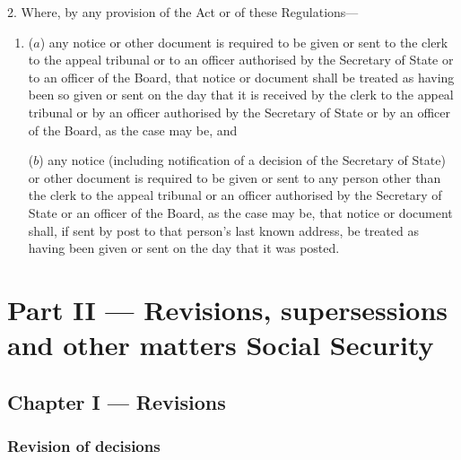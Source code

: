 \documentclass[12pt,a4paper]{article}
\begin{document}
2.  Where, by any provision of the Act or of these Regulations—
\begin{enumerate}\item[]
($a$) any notice or other document is required to be given or sent to the clerk to the appeal tribunal or to an officer authorised by the Secretary of State
or to an officer of the Board,  %
that notice or document shall be treated as having been so given or sent on the day that it is received by the clerk to the appeal tribunal or by an officer authorised by the Secretary of State
or by an officer of the Board,  %
as the case may be, and

($b$) any notice (including notification of a decision of the Secretary of State) or other document is required to be given or sent to any person other than the clerk to the appeal tribunal 
or an officer  %
authorised by the Secretary of State
or an officer of the Board,  %
as the case may be, that notice or document shall, if sent by post to that person’s last known address, be treated as having been given or sent on the day that it was posted.
\end{enumerate}


\section[Part II --- Revisions, supersessions and other matters Social Security]{Part II --- Revisions, supersessions and other matters Social Security}

\subsection[Chapter I --- Revisions]{Chapter I --- Revisions}

\subsubsection[3. Revision of decisions]{Revision of decisions}

\renewcommand\parthead{--- Part II Chapter I}
\end{document}
